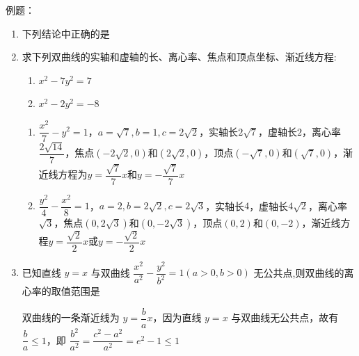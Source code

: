 例题：
\begin{enumerate}
    \item 下列结论中正确的是
    
    \item 求下列双曲线的实轴和虚轴的长、离心率、焦点和顶点坐标、渐近线方程:
    \begin{enumerate}
        \item ${x}^{2} - 7{y}^{2} = 7$
        \item ${x}^{2} - 2{y}^{2} =  -8$
    \end{enumerate}
    \begin{jieda}
        \begin{enumerate}
            \item $\dfrac{x^2}{7} - {y}^{2} = 1$，$a = \sqrt{7}, b = 1, c = 2\sqrt{2}$，实轴长$2\sqrt{7}$，虚轴长$2$，离心率$\dfrac{2\sqrt{14}}{7}$，焦点$(-2\sqrt{2}, 0)$和$(2\sqrt{2}, 0)$，顶点$(-\sqrt{7}, 0)$和$(\sqrt{7}, 0)$，渐近线方程为$y = \dfrac{\sqrt{7}}{7}x$和$y = -\dfrac{\sqrt{7}}{7}x$
            \item $\dfrac{y^2}{4} - \dfrac{x^2}{8} = 1$，$a = 2, b = 2\sqrt{2}, c = 2\sqrt{3}$，实轴长$4$，虚轴长$4\sqrt{2}$，离心率$\sqrt{3}$，焦点$(0, 2\sqrt{3})$和$(0, -2\sqrt{3})$，顶点$(0, 2)$和$(0, -2)$，渐近线方程$y = \dfrac{\sqrt{2}}{2}x$或$y = -\dfrac{\sqrt{2}}{2}x$
        \end{enumerate}
    \end{jieda}
    \item 已知直线 $y = x$ 与双曲线 $\dfrac{{x}^{2}}{{a}^{2}} - \dfrac{{y}^{2}}{{b}^{2}} = 1\left( {a > 0,b > 0}\right)$ 无公共点,则双曲线的离心率的取值范围是\blkda{$(1, \sqrt{2}]$}
    \begin{jieda}
        双曲线的一条渐近线为 $y = \dfrac{b}{a}x$，因为直线 $y = x$ 与双曲线无公共点，故有 $\dfrac{b}{a} \leq  1$，即 $\dfrac{{b}^{2}}{{a}^{2}} = \dfrac{{c}^{2} - {a}^{2}}{{a}^{2}} = {e}^{2} - 1 \leq  1$
        

\end{jieda}
\end{enumerate}
